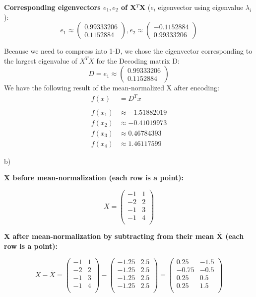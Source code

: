 \documentclass{article}
\begin{document}
\textbf{Corresponding eigenvectors $e_1, e_2$ of X$^T$X} ($e_i$ eigenvector using eigenvalue $\lambda_i$):
$$e_1 \approx \begin{pmatrix}0.99333206 \\ 0.1152884\end{pmatrix}, e_2 \approx \begin{pmatrix}-0.1152884 \\ 0.99333206\end{pmatrix}$$

Because we need to compress into 1-D, we chose the eigenvector corresponding to the largest eigenvalue of $X^T X$ for the Decoding matrix D:
$$D = e_1 \approx \begin{pmatrix}0.99333206 \\ 0.1152884\end{pmatrix}$$
We have the following result of the mean-normalized X after encoding: 
\begin{align*}
f(x) &= D^{T}x\\
\\
f(x_1) &\approx -1.51882019\\
f(x_2) &\approx -0.41019973\\
f(x_3) &\approx 0.46784393\\
f(x_4) &\approx 1.46117599
\end{align*}

\newpage

b)

\textbf{X before mean-normalization (each row is a point):}

$$X = \begin{pmatrix}
-1 & 1 \\
-2 & 2 \\
-1 & 3 \\
-1 & 4\\
\end{pmatrix}$$
 
\textbf{X after mean-normalization by subtracting from their mean $\overline{\textbf{X}}$ (each row is a point):}

$$X - \overline{X} = 
\begin{pmatrix}
-1 & 1 \\
-2 & 2 \\
-1 & 3 \\
-1 & 4\\
\end{pmatrix} -
\begin{pmatrix}
-1.25 & 2.5\\
-1.25 & 2.5\\
-1.25 & 2.5\\
-1.25 & 2.5\\
\end{pmatrix} = 
\begin{pmatrix}
0.25 & -1.5 \\
-0.75 & -0.5 \\
0.25 & 0.5 \\
0.25 & 1.5 \\
\end{pmatrix}
$$
\end{document}
